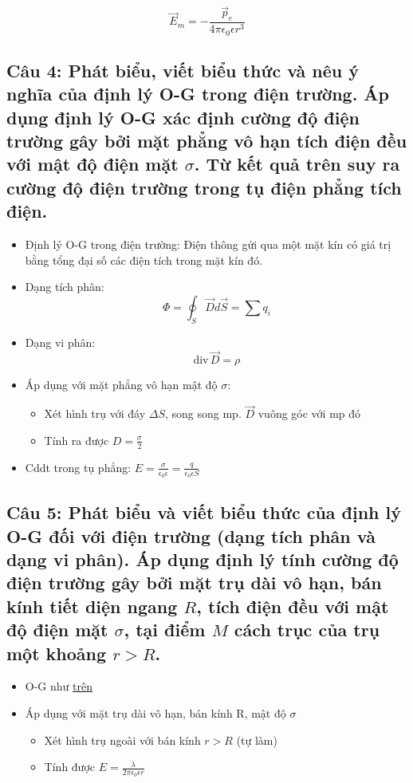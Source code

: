 \begin{equation*}
  \vec{E}_m = - \frac{\vec{p}_e}{4\pi\epsilon_0\epsilon r^3}
\end{equation*}

\subsection[Câu 4]{Câu 4: Phát biểu, viết biểu thức và nêu ý nghĩa của định lý O-G trong điện trường. Áp dụng định lý O-G xác định cường độ điện trường gây bởi mặt phẳng vô hạn tích điện đều với mật độ điện mặt $\sigma$. Từ kết quả trên suy ra cường độ điện trường trong tụ điện phẳng tích điện.}\label{def:o-g}

\begin{itemize}
  \item Định lý O-G trong điện trường: Điện thông gửi qua một mặt kín có giá trị bằng tổng đại số các điện tích trong mặt kín đó.
  \item Dạng tích phân: $$\Phi = \oint_S \vec{D}d\vec{S} = \sum\limits q_i$$
  \item Dạng vi phân: $$\text{div}\,\vec{D} = \rho$$
  \item Áp dụng với mặt phẳng vô hạn mật độ $\sigma$:
  \begin{itemize}
    \item Xét hình trụ với đáy $\Delta S$, song song mp. $\vec{D}$ vuông góc với mp đó
    \item Tính ra được $D = \frac{\sigma}{2}$
  \end{itemize}
  \item Cddt trong tụ phẳng: $E = \frac{\sigma}{\epsilon_0\epsilon} = \frac{q}{\epsilon_0\epsilon S}$
\end{itemize}

\subsection[Câu 5]{Câu 5: Phát biểu và viết biểu thức của định lý O-G đối với điện trường (dạng tích phân và dạng vi phân). Áp dụng định lý tính cường độ điện trường gây bởi mặt trụ dài vô hạn, bán kính tiết diện ngang $R$, tích điện đều với mật độ điện mặt $\sigma$, tại điểm $M$ cách trục của trụ một khoảng $r>R$.}

\begin{itemize}
  \item O-G như \hyperref[def:o-g]{trên}
  \item Áp dụng với mặt trụ dài vô hạn, bán kính R, mật độ $\sigma$
  \begin{itemize}
    \item Xét hình trụ ngoài với bán kính $r > R$ (tự làm)
    \item Tính được $E = \frac{\lambda}{2\pi\epsilon_0\epsilon r}$
  \end{itemize}
\end{itemize}

